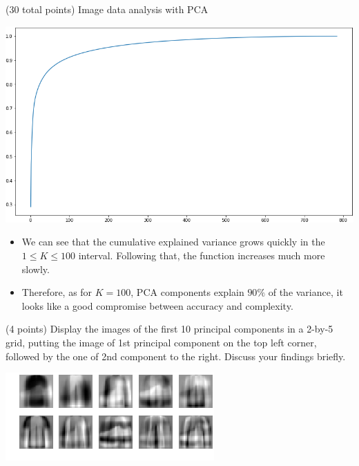 \documentclass[12pt]{article}
\begin{document}
\begin{question}{(30 total points) Image data analysis with PCA}
\begin{subquestion}
      \begin{answerbox}{30em}
        \begin{center}
			\includegraphics[width=\textwidth]{imgs/1_4.png}
		\end{center}
		\begin{itemize}
		\itemsep -3pt {}
		\item We can see that the cumulative explained variance grows quickly in the $ 1 \leq K  \leq 100 $ interval. Following that, the function increases much more slowly.
		\item Therefore, as for $K=100$, PCA components explain $90\%$ of the variance, it looks like a good compromise between accuracy and complexity.
		\end{itemize}
      \end{answerbox}
  


   \end{subquestion}

   \begin{subquestion}{(4 points)
      Display the images of the first 10 principal components in
      a 2-by-5 grid, putting the image of 1st principal component on
      the top left corner, followed by the one of 2nd component to the right.
      Discuss your findings briefly.
     } \label{Q1.disp.pca}
   

      \begin{answerbox}{35em}
         \begin{center}
	\includegraphics[width=\textwidth]{imgs/1_5.png}
	\end{center}
	

\end{answerbox}
\end{subquestion}
\end{question}
\end{document}
